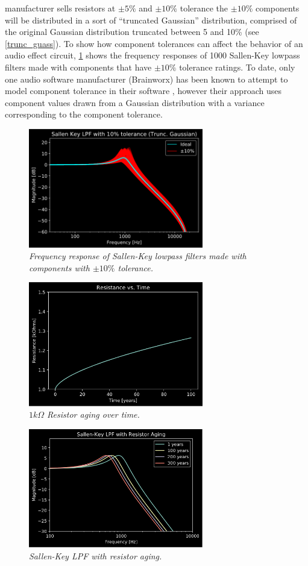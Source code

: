 \documentclass[twoside,a4paper]{article}
\begin{document}
manufacturer sells resistors at $\pm 5\%$ and $\pm 10\%$ tolerance
the $\pm 10\%$ components will be distributed in a sort of ``truncated
Gaussian'' distribution, comprised of the original Gaussian
distribution truncated between 5 and 10\% (see \cref{trunc_guass}).
To show how component tolerances can affect the behavior of an audio
effect circuit, \cref{tol_LPF} shows the frequency responses of 1000
Sallen-Key lowpass filters made with components that have $\pm 10\%$
tolerance ratings. To date, only one audio software manufacturer
(Brainworx) has been known to attempt to model component tolerance in
their software \cite{BrainWorksTMT}, however their approach uses component
values drawn from a Gaussian distribution with a variance corresponding
to the component tolerance.
%
\begin{figure}[h]
    \center
    \includegraphics[width=3in]{../CMTolerance/Pics/lpf_tgauss_plot.png}
    \caption{\label{tol_LPF}{\it Frequency response of Sallen-Key lowpass
            filters made with components with $\pm 10\%$ tolerance.}}
\end{figure}
%
\begin{figure}[!htb]
    \center
    \includegraphics[width=3in]{../CMAging/Pics/r_time.png}
    \caption{\label{res-age}{\it $1 k\Omega$ Resistor aging over time.}}
\end{figure}
%
\begin{figure}[!htb]
    \center
    \includegraphics[width=3in]{../CMAging/Pics/r_freq.png}
    \caption{\label{res-age-freq}{\it Sallen-Key LPF with resistor aging.}}
\end{figure}
\end{document}
